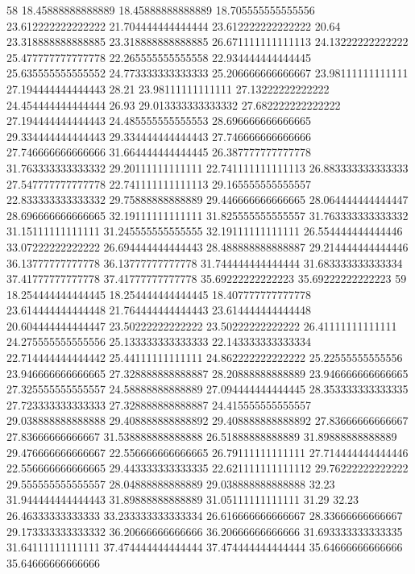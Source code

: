 58 18.45888888888889 18.45888888888889 18.705555555555556 23.612222222222222 21.704444444444444 23.612222222222222 20.64 23.318888888888885 23.318888888888885 26.671111111111113 24.13222222222222 25.477777777777778 22.265555555555558 22.934444444444445 25.635555555555552 24.773333333333333 25.206666666666667 23.98111111111111 27.194444444444443 28.21 23.98111111111111 27.13222222222222 24.454444444444444 26.93 29.013333333333332 27.682222222222222 27.194444444444443 24.485555555555553 28.696666666666665 29.334444444444443 29.334444444444443 27.746666666666666 27.746666666666666 31.664444444444445 26.387777777777778 31.763333333333332 29.20111111111111 22.741111111111113 26.883333333333333 27.547777777777778 22.741111111111113 29.165555555555557 22.833333333333332 29.75888888888889 29.446666666666665 28.064444444444447 28.696666666666665 32.19111111111111 31.825555555555557 31.763333333333332 31.15111111111111 31.245555555555555 32.19111111111111 26.554444444444446 33.07222222222222 26.694444444444443 28.488888888888887 29.214444444444446 36.13777777777778 36.13777777777778 31.744444444444444 31.683333333333334 37.41777777777778 37.41777777777778 35.69222222222223 35.69222222222223
59 18.254444444444445 18.254444444444445 18.407777777777778 23.614444444444448 21.764444444444443 23.614444444444448 20.604444444444447 23.50222222222222 23.50222222222222 26.41111111111111 24.275555555555556 25.133333333333333 22.143333333333334 22.714444444444442 25.44111111111111 24.862222222222222 25.22555555555556 23.946666666666665 27.328888888888887 28.20888888888889 23.946666666666665 27.325555555555557 24.58888888888889 27.094444444444445 28.353333333333335 27.723333333333333 27.328888888888887 24.415555555555557 29.038888888888888 29.408888888888892 29.408888888888892 27.83666666666667 27.83666666666667 31.538888888888888 26.51888888888889 31.89888888888889 29.476666666666667 22.556666666666665 26.79111111111111 27.714444444444446 22.556666666666665 29.443333333333335 22.621111111111112 29.76222222222222 29.555555555555557 28.04888888888889 29.038888888888888 32.23 31.944444444444443 31.89888888888889 31.05111111111111 31.29 32.23 26.46333333333333 33.233333333333334 26.616666666666667 28.33666666666667 29.173333333333332 36.20666666666666 36.20666666666666 31.693333333333335 31.64111111111111 37.474444444444444 37.474444444444444 35.64666666666666 35.64666666666666

